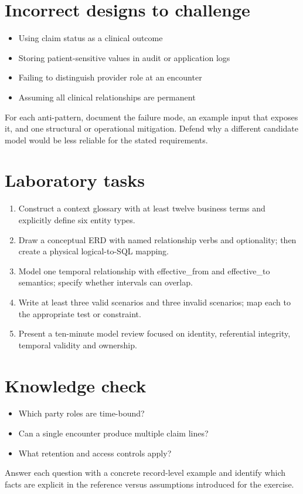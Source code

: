 \documentclass[11pt,letterpaper]{article}
\begin{document}
\section{Incorrect designs to challenge}
\begin{itemize}
\item Using claim status as a clinical outcome
\item Storing patient-sensitive values in audit or application logs
\item Failing to distinguish provider role at an encounter
\item Assuming all clinical relationships are permanent
\end{itemize}
For each anti-pattern, document the failure mode, an example input that exposes it, and one structural or operational mitigation. Defend why a different candidate model would be less reliable for the stated requirements.


\section{Laboratory tasks}
\begin{enumerate}
\item Construct a context glossary with at least twelve business terms and explicitly define six entity types.
\item Draw a conceptual ERD with named relationship verbs and optionality; then create a physical logical-to-SQL mapping.
\item Model one temporal relationship with effective\_from and effective\_to semantics; specify whether intervals can overlap.
\item Write at least three valid scenarios and three invalid scenarios; map each to the appropriate test or constraint.
\item Present a ten-minute model review focused on identity, referential integrity, temporal validity and ownership.
\end{enumerate}

\section{Knowledge check}
\begin{itemize}
\item Which party roles are time-bound?
\item Can a single encounter produce multiple claim lines?
\item What retention and access controls apply?
\end{itemize}
Answer each question with a concrete record-level example and identify which facts are explicit in the reference versus assumptions introduced for the exercise.
\end{document}

